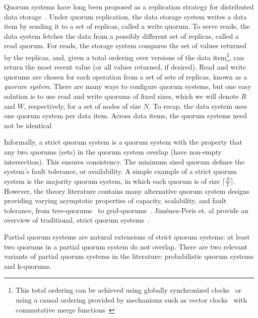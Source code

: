 \documentclass{vldb}
\begin{document}
Quorum systems have long been proposed as a replication strategy for
distributed data storage~\cite{quorums-start}.  Under quorum
replication, the data storage system writes a data item by sending it
to a set of replicas, called a write quorum.  To serve reads, the data
system fetches the data from a possibly different set of replicas,
called a read quorum.  For reads, the storage system compares the set
of values returned by the replicas, and, given a total ordering over
versions of the data item\footnote{This total ordering can be achieved
  using globally synchronized clocks~\cite{synch-clocks} or using a
  causal ordering provided by mechanisms such as vector
  clocks~\cite{vectorclock} with commutative merge
  functions~\cite{cops}}, can return the most recent value (or all
values returned, if desired).  Read and write quorums are chosen for
each operation from a set of sets of replicas, known as a
\textit{quorum system}.  There are many ways to configure quorum
systems, but one easy solution is to use read and write quorums of
fixed sizes, which we will denote $R$ and $W$, respectively, for a set
of nodes of size $N$.  To recap, the data system uses one quorum
system per data item.  Across data items, the quorum systems need not
be identical

Informally, a strict quorum system is a quorum system with the
property that any two quorums (sets) in the quorum system overlap
(have non-empty intersection). This ensures consistency.  The minimum
sized quorum defines the system's fault tolerance, or availability.  A
simple example of a strict quorum system is the majority quorum
system, in which each quorum is of size $\lceil \frac{N}{2}\rceil$.
However, the theory literature contains many alternative quorum
system designs providing varying asymptotic properties of capacity,
scalability, and fault tolerance, from tree-quorums~\cite{treequorum}
to grid-quorums~\cite{quorumsystems}.  Jim\'{e}nez-Peris et. al
provide an overview of traditional, strict quorum
systems~\cite{quorums-alternative}.

Partial quorum systems are natural extensions of strict quorum
systems: at least two quorums in a partial quorum system do not
overlap.  There are two relevant variants of partial quorum systems in
the literature: probabilistic quorum systems and k-quorums.
\end{document}
